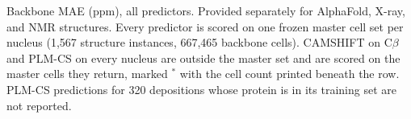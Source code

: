 Backbone MAE (ppm), all predictors. Provided separately for AlphaFold, X-ray, and NMR structures. Every predictor is scored on one frozen master cell set per nucleus (1,567 structure instances, 667,465 backbone cells). CAMSHIFT on C$\beta$ and PLM-CS on every nucleus are outside the master set and are scored on the master cells they return, marked $^{\ast}$ with the cell count printed beneath the row. PLM-CS predictions for 320 depositions whose protein is in its training set are not reported.
